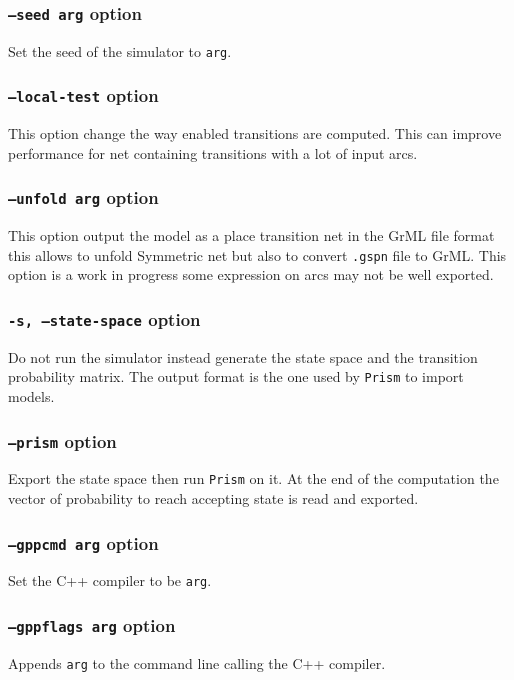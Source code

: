 \documentclass{article}
\begin{document}
\subsubsection{\texttt{--seed arg} option}
Set the seed of the simulator to \texttt{arg}. 

\subsubsection{\texttt{--local-test} option}
This option change the way enabled transitions are computed.  This can
improve performance for net containing transitions with a lot of input
arcs.


\subsubsection{\texttt{--unfold arg} option}
This option output the model as a place transition net in the GrML
file format this allows to unfold Symmetric net but also to convert
\texttt{.gspn} file to GrML. This option is a work in progress some
expression on arcs may not be well exported.


\subsubsection{\texttt{-s, --state-space} option}
Do not run the simulator instead generate the state space and 
the transition probability matrix. The output format is the one
used by \texttt{Prism} to import models. 

\subsubsection{\texttt{--prism} option}
Export the state space then run \texttt{Prism} on it.
At the end of the computation the vector of probability to reach
accepting state is read and exported.

\subsubsection{\texttt{--gppcmd arg} option}
Set the C++ compiler to be \texttt{arg}.

\subsubsection{\texttt{--gppflags arg} option}
Appends \texttt{arg} to the command line calling the C++ compiler.
\end{document}
